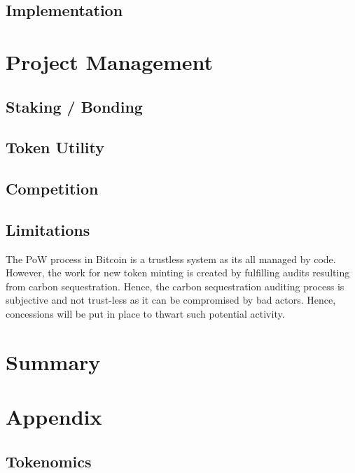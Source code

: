 \documentclass{article}
\begin{document}
\lipsum[1-1]


\subsection{Implementation}

\lipsum[1-1]

\section{Project Management}

\subsection{Staking / Bonding}

\lipsum[1-1]

\subsection{Token Utility}

\lipsum[1-1]


\subsection{Competition}

\lipsum[1-1]

\subsection{Limitations}

The PoW process in Bitcoin is a trustless system as its all managed by code. However, the work for new token minting is created by fulfilling audits resulting from carbon sequestration. Hence, the carbon sequestration auditing process is subjective and not trust-less as it can be compromised by bad actors. Hence, concessions will be put in place to thwart such potential activity.

\section{Summary}

\lipsum[1-1]

\section{Appendix}

\subsection{Tokenomics}
\label{section:tokenomics}
\end{document}
